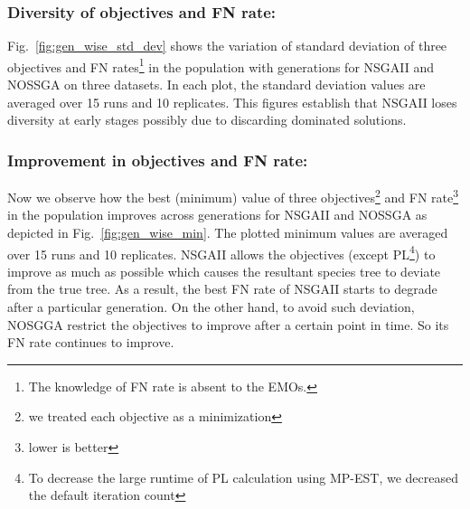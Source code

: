 \subsubsection{Diversity of objectives and FN rate:}\label{subsubsec:diversity} Fig.~\ref{fig:gen_wise_std_dev} shows the variation of standard deviation of three objectives and FN rates\footnote{The knowledge of FN rate is absent to the EMOs.} in the population with generations for NSGAII and NOSSGA on three datasets. In each plot, the standard deviation values are averaged over 15 runs and 10 replicates. This figures establish that NSGAII loses diversity at early stages possibly due to discarding dominated solutions.    


\subsubsection{Improvement in objectives and FN rate:} Now we observe how the best (minimum) value of three objectives\footnote{we treated each objective as a minimization} and FN rate\footnote{lower is better} in the population improves across generations for NSGAII and NOSSGA as depicted in Fig.~\ref{fig:gen_wise_min}. The plotted minimum values are averaged over 15 runs and 10 replicates. NSGAII allows the objectives (except PL\footnote{To decrease the large runtime of PL calculation using MP-EST, we decreased the default iteration count}) to improve as much as possible which causes the resultant species tree to deviate from the true tree. As a result, the best FN rate of NSGAII starts to degrade after a particular generation. On the other hand, to avoid such deviation, NOSGGA restrict the objectives to improve after a certain point in time. So its FN rate continues to improve.

